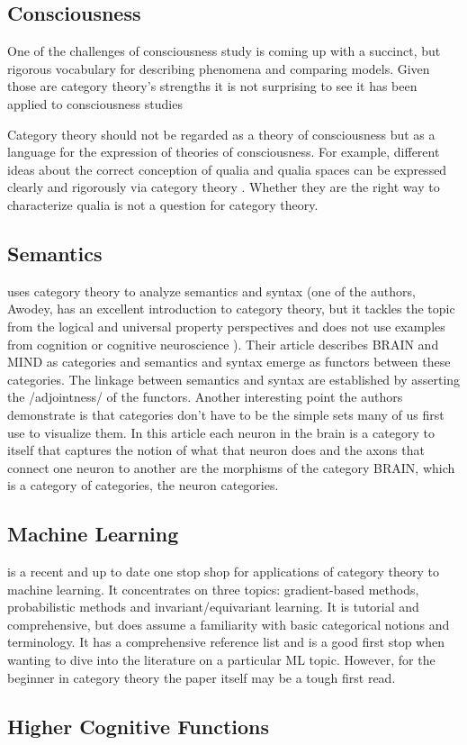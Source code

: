 \documentclass{article}
\begin{document}
\subsection{Consciousness}
\label{sec:consciousness}

One of the challenges of consciousness study is coming up with a succinct, but rigorous vocabulary for describing phenomena and comparing models. Given those are category theory's strengths it is not surprising to see it has been applied to consciousness studies \autocite{kato2002category, Northoff674242, tsuchiya2016using}

Category theory should not be regarded as a theory of consciousness but as a language for the expression of theories of consciousness. For example, different ideas about the correct conception of qualia and qualia spaces can be expressed clearly and rigorously via category theory \autocite{tsuchiya22_enric_categ_as_model_qualia}. Whether they are the right way to characterize qualia is not a question for category theory.

\subsection{Semantics}
\textcite{heller19_homun_brain_categ_logic} uses category theory to analyze semantics and syntax (one of the authors, Awodey, has an excellent introduction to category theory, but it tackles the topic from the logical and universal property perspectives and does not use examples from cognition or cognitive neuroscience \autocite{awodey10_categ}). Their article describes BRAIN and MIND as categories and semantics and syntax emerge as functors between these categories. The linkage between semantics and syntax are established by asserting the /adjointness/ of the functors. Another interesting point the authors demonstrate is that categories don't have to be the simple sets many of us first use to visualize them. In this article each neuron in the brain is a category to itself that captures the notion of what that neuron does and the axons that connect one neuron to another are the morphisms of the category BRAIN, which is a category of categories, the neuron categories. 

\subsection{Machine Learning}
\textcite{shiebler21_categ_theor_machin_learn} is a recent and up to date one stop shop for applications of category theory to machine learning. It concentrates on three topics: gradient-based methods, probabilistic methods and invariant/equivariant learning. It is tutorial and comprehensive, but does assume a familiarity with basic categorical notions and terminology. It has a comprehensive reference list and is a good first stop when wanting to dive into the literature on a particular ML topic. However, for the beginner in category theory the paper itself may be a tough first read.


\subsection{Higher Cognitive Functions}
\textcite{ehresmann2015conciliating}

\autocite{gomez-ramirez14_new_found_repres_cognit_brain_scien}

\printbibliography
\end{document}
